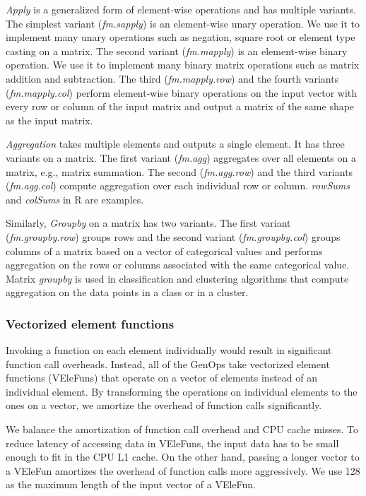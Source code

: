 \textit{Apply} is a generalized form of element-wise operations and has
multiple variants. The simplest variant (\textit{fm.sapply}) is
an element-wise unary operation. We use it to implement many unary
operations such as negation, square root or element type casting
on a matrix. The second variant (\textit{fm.mapply}) is an
element-wise binary operation. We use it to implement many binary
matrix operations such as matrix addition and subtraction. The third
(\textit{fm.mapply.row}) and the fourth variants (\textit{fm.mapply.col}) perform element-wise
binary operations on the input vector with every row or column of the input
matrix and output a matrix of the same shape as the input matrix.

\textit{Aggregation} takes multiple elements and outputs a single element.
It has three variants on a matrix. The first variant (\textit{fm.agg})
aggregates over all elements on a matrix, e.g., matrix summation. The second
(\textit{fm.agg.row}) and the third variants (\textit{fm.agg.col})
compute aggregation over each individual row or column. \textit{rowSums}
and \textit{colSums} in R are examples.

Similarly, \textit{Groupby} on a matrix has two variants.
The first variant (\textit{fm.groupby.row}) groups rows and the second variant
(\textit{fm.groupby.col}) groups columns of a matrix based on a vector of
categorical values and performs aggregation on the rows or
columns associated with the same categorical value. Matrix \textit{groupby}
is used in classification and clustering algorithms that compute
aggregation on the data points in a class or in a cluster.

\subsubsection{Vectorized element functions} \label{sec:vef}
Invoking a function on each element individually would
result in significant function call overheads. Instead, all of
the GenOps take vectorized element functions (VEleFuns) that operate on
a vector of elements instead of an individual element. By transforming
the operations on individual elements to the ones on a vector, we amortize
the overhead of function calls significantly.

We balance the amortization of function call overhead and CPU cache misses.
To reduce latency of accessing data in VEleFuns,
the input data has to be small enough to fit in the CPU L1 cache. On the
other hand, passing a longer vector to a VEleFun amortizes the overhead of
function calls more aggressively. We use 128 as the maximum length of
the input vector of a VEleFun. %

